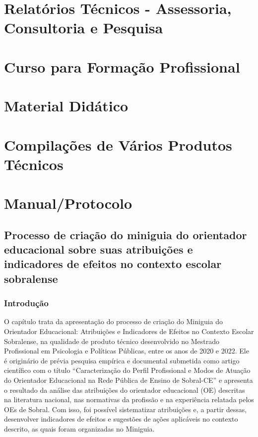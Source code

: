 \documentclass[
  letterpaper,
  DIV=11,
  numbers=noendperiod,
  oneside]{scrreprt}
\begin{document}
\part{Relatórios Técnicos - Assessoria, Consultoria e Pesquisa}

\part{Curso para Formação Profissional}

\part{Material Didático}

\part{Compilações de Vários Produtos Técnicos}

\part{Manual/Protocolo}

\hypertarget{processo-de-criauxe7uxe3o-do-miniguia-do-orientador-educacional-sobre-suas-atribuiuxe7uxf5es-e-indicadores-de-efeitos-no-contexto-escolar-sobralense}{%
\chapter{Processo de criação do miniguia do orientador educacional sobre
suas atribuições e indicadores de efeitos no contexto escolar
sobralense}\label{processo-de-criauxe7uxe3o-do-miniguia-do-orientador-educacional-sobre-suas-atribuiuxe7uxf5es-e-indicadores-de-efeitos-no-contexto-escolar-sobralense}}

\hypertarget{introduuxe7uxe3o}{%
\section{Introdução}\label{introduuxe7uxe3o}}

O capítulo trata da apresentação do processo de criação do Miniguia do
Orientador Educacional: Atribuições e Indicadores de Efeitos no Contexto
Escolar Sobralense, na qualidade de produto técnico desenvolvido no
Mestrado Profissional em Psicologia e Políticas Públicas, entre os anos
de 2020 e 2022. Ele é originário de prévia pesquisa empírica e
documental submetida como artigo científico com o título
``Caracterização do Perfil Profissional e Modos de Atuação do Orientador
Educacional na Rede Pública de Ensino de Sobral-CE'' e apresenta o
resultado da análise das atribuições do orientador educacional (OE)
descritas na literatura nacional, nas normativas da profissão e na
experiência relatada pelos OEs de Sobral. Com isso, foi possível
sistematizar atribuições e, a partir dessas, desenvolver indicadores de
efeitos e sugestões de ações aplicáveis no contexto descrito, as quais
foram organizadas no Miniguia.
\end{document}
